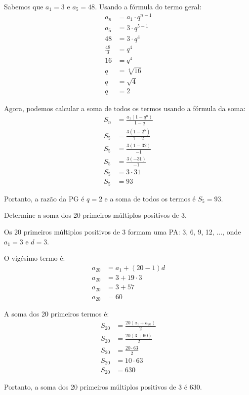 \documentclass[12pt,a4paper]{article}
\begin{document}
\begin{tcolorbox}[colback=green!5!white,colframe=green!75!black,title=Resolução]
Sabemos que $a_1 = 3$ e $a_5 = 48$. Usando a fórmula do termo geral:
\begin{align}
a_n &= a_1 \cdot q^{n-1}\\
a_5 &= 3 \cdot q^{5-1}\\
48 &= 3 \cdot q^4\\
\frac{48}{3} &= q^4\\
16 &= q^4\\
q &= \sqrt[4]{16}\\
q &= \sqrt{4}\\
q &= 2
\end{align}

Agora, podemos calcular a soma de todos os termos usando a fórmula da soma:
\begin{align}
S_n &= \frac{a_1(1-q^n)}{1-q}\\
S_5 &= \frac{3(1-2^5)}{1-2}\\
S_5 &= \frac{3(1-32)}{-1}\\
S_5 &= \frac{3(-31)}{-1}\\
S_5 &= 3 \cdot 31\\
S_5 &= 93
\end{align}

Portanto, a razão da PG é $q = 2$ e a soma de todos os termos é $S_5 = 93$.
\end{tcolorbox}

\begin{tcolorbox}[colback=blue!5!white,colframe=blue!75!black,title=Exercício Adicional 5]
Determine a soma dos 20 primeiros múltiplos positivos de 3.
\end{tcolorbox}

\begin{tcolorbox}[colback=green!5!white,colframe=green!75!black,title=Resolução]
Os 20 primeiros múltiplos positivos de 3 formam uma PA: 3, 6, 9, 12, ..., onde $a_1 = 3$ e $d = 3$.

O vigésimo termo é:
\begin{align}
a_{20} &= a_1 + (20-1)d\\
a_{20} &= 3 + 19 \cdot 3\\
a_{20} &= 3 + 57\\
a_{20} &= 60
\end{align}

A soma dos 20 primeiros termos é:
\begin{align}
S_{20} &= \frac{20(a_1 + a_{20})}{2}\\
S_{20} &= \frac{20(3 + 60)}{2}\\
S_{20} &= \frac{20 \cdot 63}{2}\\
S_{20} &= 10 \cdot 63\\
S_{20} &= 630
\end{align}

Portanto, a soma dos 20 primeiros múltiplos positivos de 3 é 630.
\end{tcolorbox}
\end{document}
